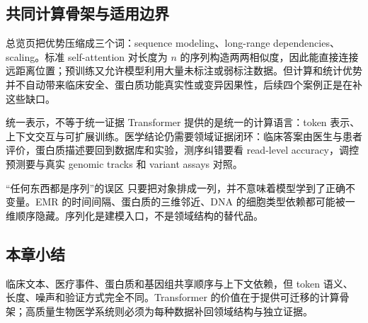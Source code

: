 \subsection{共同计算骨架与适用边界}

总览页把优势压缩成三个词：sequence modeling、long-range dependencies、scaling。标准 self-attention 对长度为 $n$ 的序列构造两两相似度，因此能直接连接远距离位置；预训练又允许模型利用大量未标注或弱标注数据。但计算和统计优势并不自动带来临床安全、蛋白质功能真实性或变异因果性，后续四个案例正是在补这些缺口。


\begin{importantbox}{统一表示，不等于统一证据}
Transformer 提供的是统一的计算语言：token 表示、上下文交互与可扩展训练。医学结论仍需要领域证据闭环：临床答案由医生与患者评价，蛋白质描述要回到数据库和实验，测序纠错要看 read-level accuracy，调控预测要与真实 genomic tracks 和 variant assays 对照。
\end{importantbox}

\begin{warningbox}{“任何东西都是序列”的误区}
只要把对象排成一列，并不意味着模型学到了正确不变量。EMR 的时间间隔、蛋白质的三维邻近、DNA 的细胞类型依赖都可能被一维顺序隐藏。序列化是建模入口，不是领域结构的替代品。
\end{warningbox}

\subsection{本章小结}

临床文本、医疗事件、蛋白质和基因组共享顺序与上下文依赖，但 token 语义、长度、噪声和验证方式完全不同。Transformer 的价值在于提供可迁移的计算骨架；高质量生物医学系统则必须为每种数据补回领域结构与独立证据。

